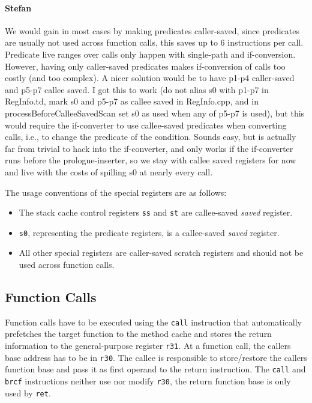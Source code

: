 \documentclass{IEEEtran}
\newcommand{\comment}[3]{\paragraph*{\textbf{#1}}{\color{#3}#2}}
\newcommand{\stefan}[1]{\comment{Stefan}{#1}{RoyalPurple}}
\begin{document}
\stefan{We would gain in most cases by making predicates caller-saved, since predicates are usually not 
used across function calls, this saves up to 6 instructions per call. 
Predicate live ranges over calls only happen with single-path and if-conversion. However, having only caller-saved predicates
makes if-conversion of calls too costly (and too complex). A nicer solution would be to have p1-p4 caller-saved and
p5-p7 callee saved. I got this to work (do not alias s0 with p1-p7 in RegInfo.td, mark s0 and p5-p7 as callee saved 
in RegInfo.cpp, and in processBeforeCalleeSavedScan set s0 as used when any of p5-p7 is used), but this would require the
if-converter to use callee-saved predicates when converting calls, i.e., to change the predicate of the condition.
Sounds easy, but is actually far from trivial to hack into the if-converter, and only works if the if-converter runs before the
prologue-inserter, so we stay with callee saved registers for now and live with the costs of spilling s0 at nearly every call.}


The usage conventions of the special registers are as follows:
\begin{itemize}
  \item The stack cache control registers \texttt{ss} and \texttt{st} are callee-saved
        \emph{saved} register.
  \item \texttt{s0}, representing the predicate registers, is a callee-saved \emph{saved} register.
  \item All other special registers are caller-saved scratch registers and should not be used
        across function calls.
\end{itemize}

\subsection{Function Calls}
\label{sec:function_calls}

Function calls have to be executed using the \texttt{call}
instruction that automatically prefetches the target function to the method
cache and stores the return information to the general-purpose register \texttt{r31}.
At a function call, the callers base address has to be in \texttt{r30}.
The callee is responsible to store/restore the callers function base and pass it as first
operand to the return instruction. 
The \texttt{call} and \texttt{brcf} instructions neither use nor modify \texttt{r30}, the
return function base is only used by \texttt{ret}.
\end{document}
